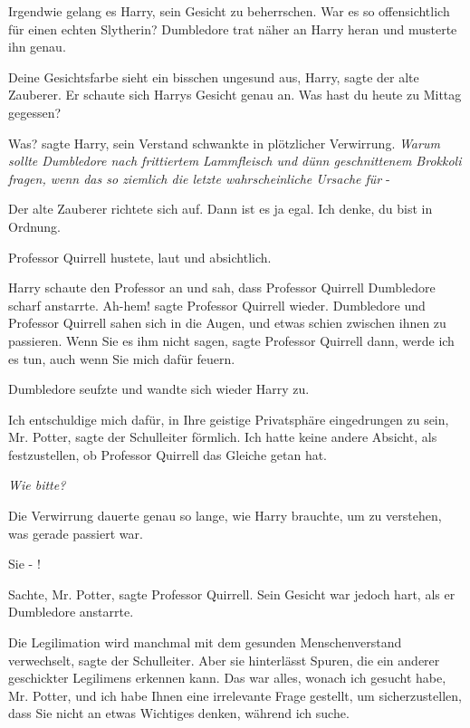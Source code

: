 Irgendwie gelang es Harry, sein Gesicht zu beherrschen. War es so offensichtlich
für einen echten Slytherin? Dumbledore trat näher an Harry heran und musterte
ihn genau.

\glqq Deine Gesichtsfarbe sieht ein bisschen ungesund aus, Harry\grqq{}, sagte
der alte Zauberer. Er schaute sich Harrys Gesicht genau an. \glqq Was hast du
heute zu Mittag gegessen?\grqq{}

\glqq Was?\grqq{} sagte Harry, sein Verstand schwankte in plötzlicher
Verwirrung. \emph{Warum sollte Dumbledore nach frittiertem Lammfleisch und dünn
geschnittenem Brokkoli fragen, wenn das so ziemlich die letzte wahrscheinliche
Ursache für} -

Der alte Zauberer richtete sich auf. \glqq Dann ist es ja egal. Ich denke, du
bist in Ordnung.\grqq{}

Professor Quirrell hustete, laut und absichtlich.

Harry schaute den Professor an und sah, dass Professor Quirrell Dumbledore
scharf anstarrte. \glqq Ah-hem!\grqq{} sagte Professor Quirrell wieder.
Dumbledore und Professor Quirrell sahen sich in die Augen, und etwas schien
zwischen ihnen zu passieren. \glqq Wenn Sie es ihm nicht sagen\grqq{}, sagte
Professor Quirrell dann, \glqq werde ich es tun, auch wenn Sie mich dafür
feuern.\grqq{}

Dumbledore seufzte und wandte sich wieder Harry zu.

\glqq Ich entschuldige mich dafür, in Ihre geistige Privatsphäre eingedrungen zu
sein, Mr. Potter\grqq{}, sagte der Schulleiter förmlich. \glqq Ich hatte keine
andere Absicht, als festzustellen, ob Professor Quirrell das Gleiche getan
hat.\grqq{}

\emph{Wie bitte? }

Die Verwirrung dauerte genau so lange, wie Harry brauchte, um zu verstehen, was
gerade passiert war.

\glqq Sie - !\grqq{}

\glqq Sachte, Mr. Potter\grqq{}, sagte Professor Quirrell. Sein Gesicht war
jedoch hart, als er Dumbledore anstarrte.

\glqq Die Legilimation wird manchmal mit dem gesunden Menschenverstand
verwechselt\grqq{}, sagte der Schulleiter. \glqq Aber sie hinterlässt Spuren,
die ein anderer geschickter Legilimens erkennen kann. Das war alles, wonach ich
gesucht habe, Mr. Potter, und ich habe Ihnen eine irrelevante Frage gestellt, um
sicherzustellen, dass Sie nicht an etwas Wichtiges denken, während ich
suche.\grqq{}

